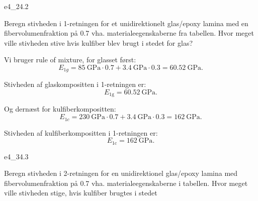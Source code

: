 

\begin{problemwithimage}{e4_2}{4.2}
  \begin{subproblems}
    \subproblem Beregn stivheden i 1-retningen for et unidirektionelt glas/epoxy lamina med en fibervolumenfraktion på \num{0,7} vha. materialeegenskaberne fra tabellen.
    \subproblem Hvor meget ville stivheden stive hvis kulfiber blev brugt i stedet for glas?
  \end{subproblems}
\end{problemwithimage}

\begin{derivation}

  \derivationpart

  Vi bruger rule of mixture, for glasset først:
  \begin{equation*}
    E_{1g} = \qty{85}{\GPa} \cdot \num{0,7} + \qty{3,4}{\GPa} \cdot \num{0,3}  = \qty{60.52}{\GPa}
  .\end{equation*}

  \begin{subresult}
    Stivheden af glaskompositten i 1-retningen er:
    \begin{equation*}
      E_{1\mathrm{g}} = \qty{60,52}{\GPa} 
    .\end{equation*}
  \end{subresult}

  \derivationpart

  Og dernæst for kulfiberkompositten:
  \begin{equation*}
    E_{1c} = \qty{230}{\GPa} \cdot \num{0,7} + \qty{3,4}{\GPa} \cdot \num{0,3}  = \qty{162}{\GPa}
  .\end{equation*}

  \begin{subresult}
    Stivheden af kulfiberkompositten i 1-retningen er:
    \begin{equation*}
      E_{1\mathrm{c}} = \qty{162}{\GPa} 
    .\end{equation*}
  \end{subresult}
\end{derivation}


\begin{problemwithimage}{e4_3}{4.3}
  \begin{subproblems}
    \subproblem Beregn stivheden i 2-retningen for en unidirektionel glas/epoxy lamina med fibervolumenfraktion på \num{0,7} vha. materialeegenskaberne i tabellen.
    \subproblem Hvor meget ville stivheden stige, hvis kulfiber brugtes i stedet
  \end{subproblems}
\end{problemwithimage}

